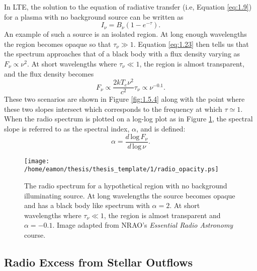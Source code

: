 In LTE, the solution to the equation of radiative transfer (i.e, Equation \ref{eq:1.9}) for a plasma with no background source can be written as 
\begin{equation}\label{eq:1.23}
I_{\nu} = B_{\nu}(1-e^{-\tau}).
\end{equation}
An example of such a source is an isolated  region. At long enough wavelengths the  region becomes opaque so that $\tau _{\nu} \gg 1$. Equation \ref{eq:1.23} then tells us that the spectrum approaches that of a black body with a flux density varying as $F_{\nu} \propto \nu ^{2}$. At short wavelengths where $\tau _{\nu} \ll 1$, the  region is almost transparent, and the flux density becomes
\begin{equation}
F_{\nu} \propto \frac{2kT_{e}\nu ^2}{c^2}\tau _{\nu} \propto \nu ^{-0.1}.
\end{equation}
These two scenarios are shown in Figure \ref{fig:1.5.4} along with the point where these two slopes intersect which corresponds to the frequency at which $\tau \simeq 1$. When the radio spectrum is plotted on a log-log plot as in Figure \ref{fig:1.5.3}, the spectral slope is referred to as the spectral index, $\alpha$, and is defined:
\begin{equation}
\alpha = \frac{d\,\mathrm{log}\,F_{\nu}}{d\,\mathrm{log}\,\nu}.
\end{equation}

\begin{figure}[hbt!]
\centering 
          \texttt{[image: /home/eamon/thesis/thesis\_template/1/radio\_opacity.ps]}
\caption[]{The radio spectrum for a hypothetical  region with no background illuminating source. At long wavelengths the source becomes opaque and has a black body like spectrum with $\alpha = 2$. At short wavelengths where $\tau _{\nu} \ll 1$, the  region is almost transparent and $\alpha = -0.1$. Image adapted from NRAO's \textit{Essential Radio Astronomy} course.}
\label{fig:1.5.3}
\end{figure}


\subsection{Radio Excess from Stellar Outflows}\label{subsec:3.1.3}

